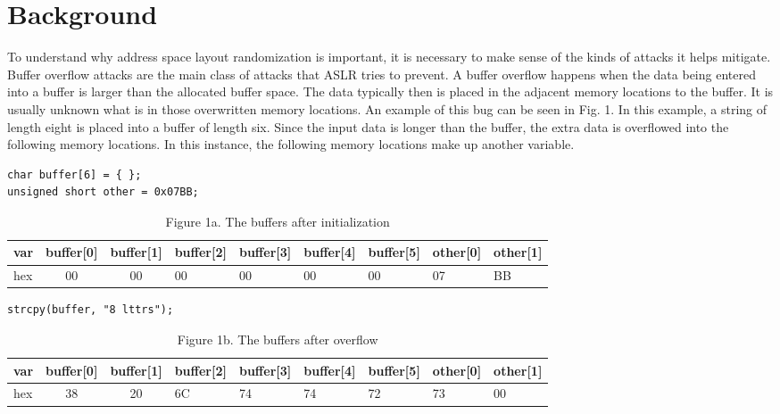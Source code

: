 \section{Background}
\label{s:background} %

To understand why address space layout randomization is important, it is necessary to make sense of the kinds of attacks it helps mitigate. Buffer overflow attacks are the main class of attacks that ASLR tries to prevent. A buffer overflow happens when the data being entered into a buffer is larger than the allocated buffer space. The data typically then is placed in the adjacent memory locations to the buffer. It is usually unknown what is in those overwritten memory locations. An example of this bug can be seen in Fig. 1. In this example, a string of length eight is placed into a buffer of length six. Since the input data is longer than the buffer, the extra data is overflowed into the following memory locations. In this instance, the following memory locations make up another variable.

\begin{lstlisting}
char buffer[6] = { };
unsigned short other = 0x07BB;
\end{lstlisting}

\begin{table}
\centering %
\begin{tabular}{l|cc} %
var & buffer[0] & buffer[1] & buffer[2] & buffer[3] & buffer[4] & buffer[5] & other[0] & other[1] \\ %
\hline %
hex & 00 & 00 & 00 & 00 & 00 & 00 & 07 & BB \\
\end{tabular}
\caption{Figure 1a. The buffers after initialization}
\label{t:fig1a}
\end{table}

\begin{lstlisting}
strcpy(buffer, "8 lttrs");
\end{lstlisting}

\begin{table}
\centering %
\begin{tabular}{l|cc} %
var & buffer[0] & buffer[1] & buffer[2] & buffer[3] & buffer[4] & buffer[5] & other[0] & other[1] \\ %
\hline %
hex & 38 & 20 & 6C & 74 & 74 & 72 & 73 & 00 \\
\end{tabular}
\caption{Figure 1b. The buffers after overflow}
\label{t:fig1b}
\end{table}

